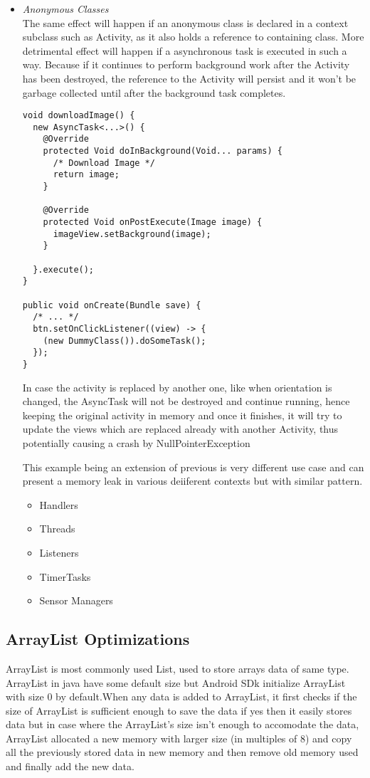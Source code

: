 \documentclass[journal]{IEEEtran}
\begin{document}
\begin{itemize}
	\item \emph{Anonymous Classes}\\
	The same effect will happen if an anonymous class is declared in a context subclass such as Activity, as it also holds a reference to containing class. More detrimental effect will happen if a asynchronous task is executed in such a way. Because if it continues to perform background work after the Activity has been destroyed, the reference to the Activity will persist and it won’t be garbage collected until after the background task completes.
\begin{verbatim}
void downloadImage() {
  new AsyncTask<...>() {
    @Override
    protected Void doInBackground(Void... params) {
      /* Download Image */
      return image;
    }
    
    @Override
    protected Void onPostExecute(Image image) {
      imageView.setBackground(image);
    }
    
  }.execute();
}

public void onCreate(Bundle save) {
  /* ... */
  btn.setOnClickListener((view) -> {
    (new DummyClass()).doSomeTask();
  });
}
\end{verbatim}
	In case the activity is replaced by another one, like when orientation is changed, the AsyncTask will not be destroyed and continue running, hence keeping the original activity in memory and once it finishes, it will try to update the views which are replaced already with another Activity, thus potentially causing a crash by NullPointerException
	
	This example being an extension of previous is very different use case and can present a memory leak in various deiiferent contexts but with similar pattern.
	\begin{itemize}
		\item Handlers
		\item Threads
		\item Listeners
		\item TimerTasks
		\item Sensor Managers
	\end{itemize}
	

\end{itemize}



\subsection{ArrayList Optimizations}
ArrayList is most commonly used List, used to store arrays data of same type. ArrayList in java have some default size but Android SDk initialize ArrayList with size 0 by default.When any data is added to ArrayList, it first checks if the size of ArrayList is sufficient enough to save the data if yes then it easily stores data but in case where the ArrayList's size isn't enough to accomodate the data, ArrayList allocated a new memory with larger size (in multiples of 8) and copy all the previously stored data in new memory and then remove old memory used and finally add the new data.
\end{document}
